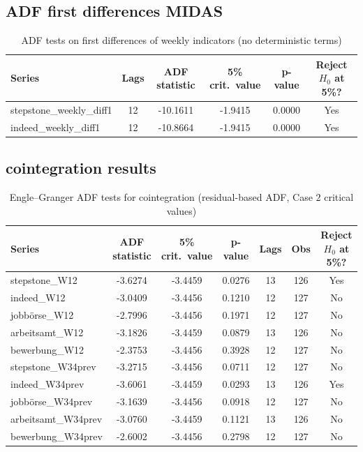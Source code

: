 \documentclass[12pt,a4paper]{article}
\begin{document}
\subsection{ADF first differences MIDAS}
\begin{table}[htbp]
\centering
\caption{ADF tests on first differences of weekly indicators (no deterministic terms)}
\label{tab:adf_weekly_diff1}
\begin{tabular}{lccccc}
\hline\hline
Series & Lags & ADF statistic & 5\% crit.\ value & p-value & Reject $H_0$ at 5\%? \\
\hline
stepstone\_weekly\_diff1  & 12 & -10.1611 & -1.9415 & 0.0000 & Yes \\
indeed\_weekly\_diff1     & 12 & -10.8664 & -1.9415 & 0.0000 & Yes \\
\hline\hline
\end{tabular}
\end{table}

\subsection{cointegration results}
\begin{table}[htbp]
\centering
\caption{Engle--Granger ADF tests for cointegration (residual-based ADF, Case 2 critical values)}
\label{tab:eg_results}
\begin{tabular}{lcccccc}
\hline\hline
Series & ADF statistic & 5\% crit.\ value & p-value & Lags & Obs & Reject $H_0$ at 5\%? \\
\hline
stepstone\_W12      & -3.6274 & -3.4459 & 0.0276 & 13 & 126 & Yes \\
indeed\_W12         & -3.0409 & -3.4456 & 0.1210 & 12 & 127 & No  \\
jobbörse\_W12       & -2.7996 & -3.4456 & 0.1971 & 12 & 127 & No  \\
arbeitsamt\_W12     & -3.1826 & -3.4459 & 0.0879 & 13 & 126 & No  \\
bewerbung\_W12      & -2.3753 & -3.4456 & 0.3928 & 12 & 127 & No  \\
stepstone\_W34prev  & -3.2715 & -3.4456 & 0.0711 & 12 & 127 & No  \\
indeed\_W34prev     & -3.6061 & -3.4459 & 0.0293 & 13 & 126 & Yes \\
jobbörse\_W34prev   & -3.1639 & -3.4456 & 0.0918 & 12 & 127 & No  \\
arbeitsamt\_W34prev & -3.0760 & -3.4459 & 0.1121 & 13 & 126 & No  \\
bewerbung\_W34prev  & -2.6002 & -3.4456 & 0.2798 & 12 & 127 & No  \\
\hline\hline
\end{tabular}
\end{table}
\end{document}
